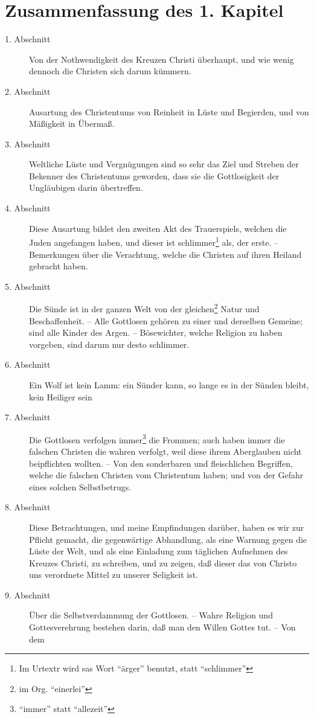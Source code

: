 \section{Zusammenfassung des 1. Kapitel}
\small
\begin{description}
\item[1. Abschnitt] Von der Nothwendigkeit des Kreuzen Christi überhaupt, und
wie wenig dennoch die Christen sich darum kümmern.
\item[2. Abschnitt] Ausartung des Christentums von Reinheit in Lüste und
Begierden, und von Mäßigkeit in Übermaß.
\item[3. Abschnitt] Weltliche Lüste und Vergnügungen sind so sehr das Ziel und
Streben der Bekenner des Christentums geworden, dass sie die Gottlosigkeit der
Ungläubigen darin übertreffen.
\item[4. Abschnitt]  Diese Ausartung bildet den zweiten Akt des Trauerspiels,
welchen die Juden angefangen haben, und dieser ist schlimmer\footnote{Im Urtextr
wird sas Wort "`ärger"' benutzt, statt "`schlimmer"'} als, der erste. --
Bemerkungen über die Verachtung, welche die Christen auf ihren Heiland gebracht
haben.
\item[5. Abschnitt] Die Sünde ist in der ganzen Welt von der
gleichen\footnote{im Org. "`einerlei"'} Natur und Beschaffenheit. -- Alle
Gottlosen gehören zu einer und derselben Gemeine; sind alle Kinder des Argen. --
Bösewichter, welche Religion zu haben vorgeben, sind darum nur desto schlimmer.
\item[6. Abschnitt] Ein Wolf ist kein Lamm: ein Sünder kann, so lange es in der
Sünden bleibt, kein Heiliger sein
\item[7. Abschnitt] Die Gottlosen verfolgen immer\footnote{"`immer"' statt
"`allezeit"'} die Frommen; auch haben immer die falschen Christen die wahren
verfolgt, weil diese ihrem Aberglauben nicht beipflichten wollten. -- Von den
sonderbaren und fleischlichen Begriffen, welche die falschen Christen vom
Christentum haben; und von der Gefahr eines solchen Selbstbetrugs.
\item[8. Abschnitt] Diese Betrachtungen, und meine Empfindungen darüber, haben
es wir zur Pflicht gemacht, die gegenwärtige Abhandlung, als eine Warnung gegen
die Lüste der Welt, und als eine Einladung zum täglichen Aufnehmen des Kreuzes
Christi, zu schreiben, und zu zeigen, daß dieser das von Christo uns verordnete
Mittel zu unserer Seligkeit ist.
\item[9. Abschnitt] Über die Selbstverdammung der Gottlosen. -- Wahre Religion
und Gottesverehrung bestehen darin, daß man den Willen Gottes tut. -- Von dem

\end{description}
